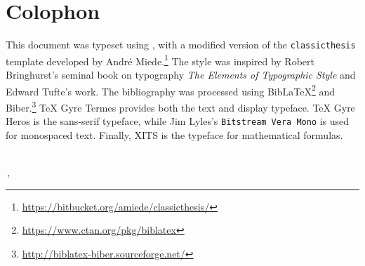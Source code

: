 \pagestyle{empty}

\hfill

\vfill


\section*{Colophon}
This document was typeset using \LuaLaTeX, with a modified version of
the \texttt{classicthesis} template developed by André
Miede.\footnote{\url{https://bitbucket.org/amiede/classicthesis/}}
The style was inspired by Robert Bringhurst's seminal book on typography
\emph{The Elements of Typographic Style}\autocite{Bringhurst2004-wn}
and Edward Tufte's work.\autocite{Tufte1983-pr, Tufte1994-wf,
Tufte1997-fx, Tufte2006-ui}
The bibliography was processed using
Bib\LaTeX\footnote{\url{https://www.ctan.org/pkg/biblatex}} and
Biber.\footnote{\url{http://biblatex-biber.sourceforge.net/}}
TeX Gyre Termes provides both the text and display typeface.
\textsf{TeX Gyre Heros} is the sans-serif typeface, while Jim Lyles's
\texttt{Bitstream Vera Mono} is used for monospaced text.
Finally, XITS is the typeface for mathematical formulas.

\bigskip
{\small
\noindent\textit{\myTitle}
\\
\noindent\textcopyright\,\submittedVersion, \myName
}
